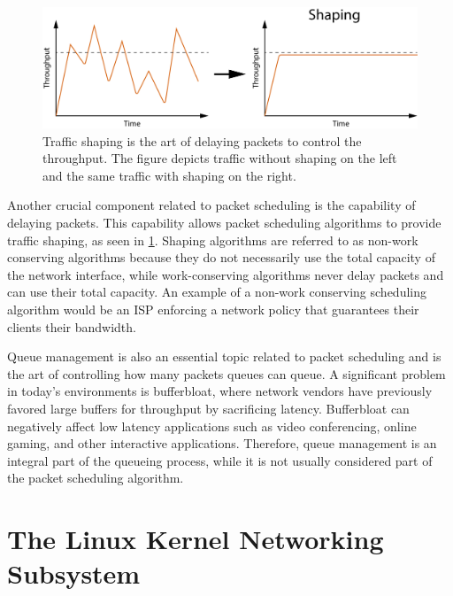 \documentclass[sigconf, nonacm]{acmart}
\begin{document}
\begin{figure}
  \includegraphics[width=\linewidth]{traffic-shaping.pdf}
  \caption{Traffic shaping is the art of delaying packets to control the throughput. The figure depicts traffic without shaping on the left and the same traffic with shaping on the right.}
  \label{fig:traffic_shaping}
\end{figure}

Another crucial component related to packet scheduling is the capability of delaying packets. This capability allows packet scheduling algorithms to provide traffic shaping, as seen in \cref{fig:traffic_shaping}. Shaping algorithms are referred to as non-work conserving algorithms because they do not necessarily use the total capacity of the network interface, while work-conserving algorithms never delay packets and can use their total capacity. An example of a non-work conserving scheduling algorithm would be an ISP enforcing a network policy that guarantees their clients their bandwidth.

Queue management is also an essential topic related to packet scheduling and is the art of controlling how many packets queues can queue. A significant problem in today's environments is bufferbloat, where network vendors have previously favored large buffers for throughput by sacrificing latency. Bufferbloat can negatively affect low latency applications such as video conferencing, online gaming, and other interactive applications. Therefore, queue management is an integral part of the queueing process, while it is not usually considered part of the packet scheduling algorithm.


\section{The Linux Kernel Networking Subsystem}
\end{document}
